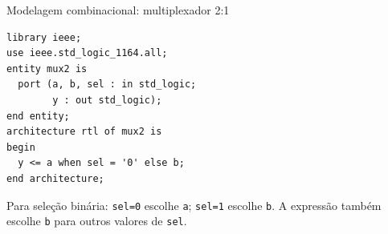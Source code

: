 \begin{frame}[fragile,t]{Modelagem combinacional: multiplexador 2:1}
\begin{lstlisting}
library ieee;
use ieee.std_logic_1164.all;
entity mux2 is
  port (a, b, sel : in std_logic;
        y : out std_logic);
end entity;
architecture rtl of mux2 is
begin
  y <= a when sel = '0' else b;
end architecture;
\end{lstlisting}\small Para seleção binária: \texttt{sel=0} escolhe \texttt{a}; \texttt{sel=1} escolhe \texttt{b}. A expressão também escolhe \texttt{b} para outros valores de \texttt{sel}.
\end{frame}
